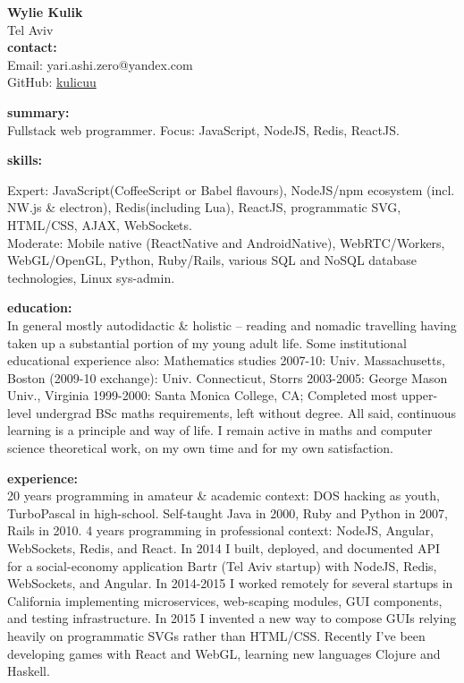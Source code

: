 



\normalFont \engrus
{\bf Wylie Kulik}
\\ Tel Aviv
\sectionSep
\\ {\bf contact:}
\\ Email: yari.ashi.zero@yandex.com
\\ GitHub: \href{}{kulicuu}

\sectionSep
{\bf summary:}
\\ Fullstack web programmer. Focus: JavaScript, NodeJS, Redis, ReactJS.

\sectionSep
{\bf skills:}

Expert: JavaScript(CoffeeScript or Babel flavours), NodeJS/npm ecosystem (incl. NW.js \& electron), Redis(including Lua), ReactJS, programmatic SVG, HTML/CSS, AJAX, WebSockets.
\\ Moderate: Mobile native (ReactNative and AndroidNative), WebRTC/Workers, WebGL/OpenGL, Python, Ruby/Rails, various SQL and NoSQL database technologies, Linux sys-admin.

\sectionSep
{\bf education:}
\\ In general mostly autodidactic \& holistic -- reading and nomadic travelling having taken up a substantial portion of my young adult life. Some institutional educational experience also: Mathematics studies 2007-10: Univ. Massachusetts, Boston (2009-10 exchange): Univ. Connecticut, Storrs 2003-2005: George Mason Univ., Virginia 1999-2000: Santa Monica College, CA; Completed most upper-level undergrad BSc maths requirements, left without degree. All said, continuous learning is a principle and way of life. I remain active in maths and computer science theoretical work, on my own time and for my own satisfaction.

\sectionSep
{\bf experience:}
\\ 20 years programming in amateur \& academic context: DOS hacking as youth, TurboPascal in high-school. Self-taught Java in 2000, Ruby and Python in 2007, Rails in 2010.
4 years programming in professional context: NodeJS, Angular, WebSockets, Redis, and React. In 2014 I built, deployed, and documented API for a social-economy application Bartr (Tel Aviv startup) with NodeJS, Redis, WebSockets, and Angular. In 2014-2015 I worked remotely for several startups in California implementing microservices, web-scaping modules, GUI components, and testing infrastructure. In 2015 I invented a new way to compose GUIs relying heavily on programmatic SVGs rather than HTML/CSS. Recently I've been developing games with React and WebGL, learning new languages Clojure and Haskell.




